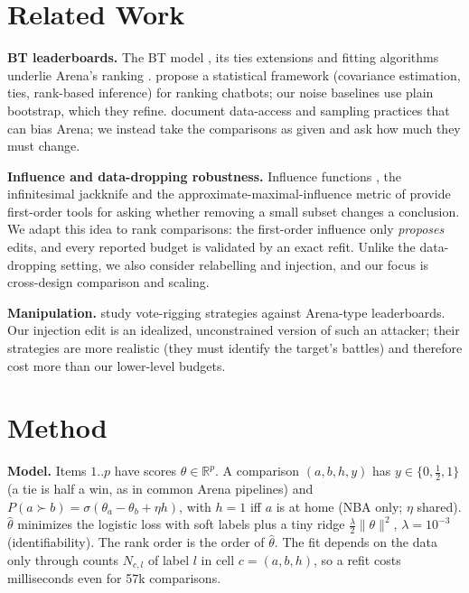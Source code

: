 \documentclass{article}
\theoremstyle{plain}
\theoremstyle{remark}
\begin{document}
\section{Related Work}
\textbf{BT leaderboards.} The BT model \citep{bradley1952}, its ties extensions \citep{raokupper1967} and fitting algorithms \citep{hunter2004} underlie Arena's ranking \citep{chiang2024}. \citet{ameli2024} propose a statistical framework (covariance estimation, ties, rank-based inference) for ranking chatbots; our noise baselines use plain bootstrap, which they refine. \citet{singh2025} document data-access and sampling practices that can bias Arena; we instead take the comparisons as given and ask how much they must change.

\textbf{Influence and data-dropping robustness.} Influence functions \citep{hampel1974,cook1977,koh2017}, the infinitesimal jackknife \citep{giordano2019} and the approximate-maximal-influence metric of \citet{broderick2020} provide first-order tools for asking whether removing a small subset changes a conclusion. We adapt this idea to rank comparisons: the first-order influence only \emph{proposes} edits, and every reported budget is validated by an exact refit. Unlike the data-dropping setting, we also consider relabelling and injection, and our focus is cross-design comparison and scaling.

\textbf{Manipulation.} \citet{min2025} study vote-rigging strategies against Arena-type leaderboards. Our injection edit is an idealized, unconstrained version of such an attacker; their strategies are more realistic (they must identify the target's battles) and therefore cost more than our lower-level budgets.

\section{Method}\label{sec:method}
\textbf{Model.} Items $1..p$ have scores $\theta\in\mathbb R^p$. A comparison $(a,b,h,y)$ has $y\in\{0,\tfrac12,1\}$ (a tie is half a win, as in common Arena pipelines) and $P(a\succ b)=\sigma(\theta_a-\theta_b+\eta h)$, with $h=1$ iff $a$ is at home (NBA only; $\eta$ shared). $\hat\theta$ minimizes the logistic loss with soft labels plus a tiny ridge $\tfrac{\lambda}{2}\|\theta\|^2$, $\lambda=10^{-3}$ (identifiability). The rank order is the order of $\hat\theta$. The fit depends on the data only through counts $N_{c,l}$ of label $l$ in cell $c=(a,b,h)$, so a refit costs milliseconds even for 57k comparisons.
\end{document}
